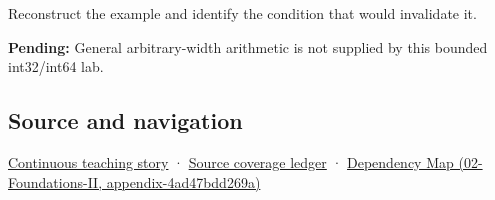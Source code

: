 Reconstruct the example and identify the condition that would invalidate it.

\textbf{Pending:} General arbitrary-width arithmetic is not supplied by this bounded int32/int64 lab.

\subsection{Source and navigation}\label{source-and-navigation}

\href{Continuous\%20Notes/Computing\%20Foundations\%20-\%20From\%20Bits\%20to\%20C++\%20and\%20Systems\%20APIs\#Choosing\%20what\%20information\%20to\%20keep}{Continuous teaching story} · \hyperref[appendix-fd090d982a15]{Source coverage ledger} · \href{}{Dependency Map (02-Foundations-II, appendix-4ad47bdd269a)}
